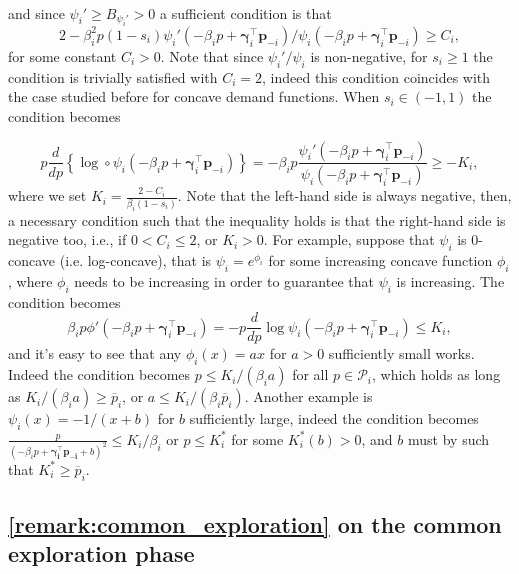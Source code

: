 \documentclass{article} %
\begin{document}
\begin{enumerate}[leftmargin=*, label=(\arabic*)]
\begin{align*}
\end{align*}
and since $\psi_i' \geq B_{\psi_i' }>0$ a sufficient condition is that 
$$
2 -\beta_i^2 p (1-s_i)\psi_{i}'(-\beta_i p + \boldsymbol{\gamma}_i^{\top}\mathbf{p}_{-i})/\psi_{i}(-\beta_i p + \boldsymbol{\gamma}_i^{\top}\mathbf{p}_{-i})\geq C_i,
$$
for some constant $C_i>0$. Note that since $\psi_i'/\psi_i$ is non-negative, for $s_i\geq 1$ the condition is trivially satisfied with $C_i=2$, indeed this condition coincides with the case studied before for concave demand functions. When $s_i \in (-1,1)$ the condition becomes 

$$
p\frac{d}{dp}\left\{ \log \circ \psi_{i}(-\beta_ip   + \boldsymbol{\gamma}_i^{\top}\mathbf{p}_{-i})\right\} = -\beta_i p \frac{\psi_{i}'(-\beta_ip   + \boldsymbol{\gamma}_i^{\top}\mathbf{p}_{-i})}{\psi_{i}(-\beta_ip   + \boldsymbol{\gamma}_i^{\top}\mathbf{p}_{-i})} \geq -K_i,
$$
where we set $K_i = \frac{2-C_i}{\beta_i(1-s_i)}$. Note that the left-hand side is always negative, then, a necessary condition such that the inequality holds is that the right-hand side is negative too, i.e., if $0<C_i\leq 2$, or $K_i>0$. For example, suppose that $\psi_i$ is $0$-concave (i.e. log-concave), that is $\psi_i = e ^{\phi_i}$ for some increasing concave function $\phi_i$, where $\phi_i$ needs to be increasing in order to guarantee that $\psi_i$ is increasing. The condition becomes
$$
\beta_i p \phi'(-\beta_i p+\boldsymbol{\gamma}_i^{\top}\mathbf{p}_{-i})=-p \frac{d}{dp} \log \psi_i(-\beta_i p+\boldsymbol{\gamma}_i^{\top}\mathbf{p}_{-i}) \leq K_i,
$$
and it's easy to see that any $\phi_i(x) =ax$ for $a>0$ sufficiently small works. Indeed the condition becomes $p\leq K_i/(\beta_i a)$ for all $p \in \mathcal{P}_i$, which holds as long as $K_i/(\beta_i a)\geq \overline{p}_i$, or $a\leq K_i/(\beta_i \overline{p}_i)$. Another example is $\psi_i(x) = -1/(x+b)$ for $b$ sufficiently large, indeed the condition becomes $\frac{p}{(-\beta_ip + \boldsymbol{\gamma_i^{\top}\mathbf{p}_{-i}}+b)^2}\leq K_i/\beta_i$ or $p\leq K_i^*$ for some $K_i^*(b)>0$, and $b$ must by such that $K_i^* \geq \overline{p}_i$.
\end{enumerate}

\subsection{\cref{remark:common_exploration} on the common exploration phase}\label{sec:remark_on_common_exploration}
\end{document}
